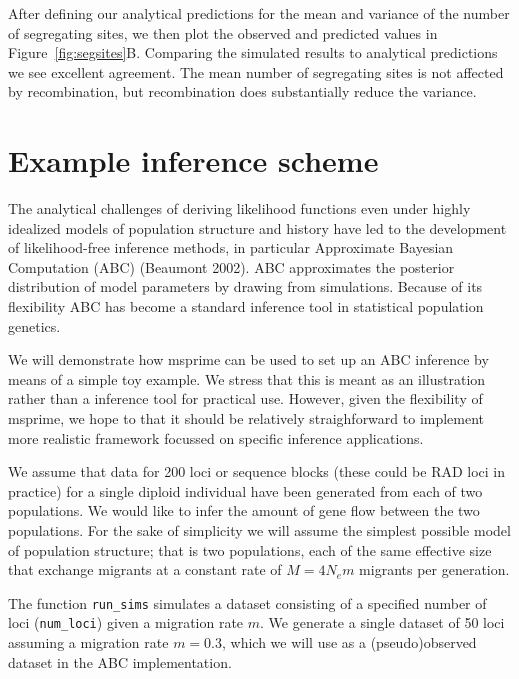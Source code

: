 \documentclass[graybox]{svmult}
\begin{document}
After defining our analytical predictions for the mean and variance of the
number of segregating sites, we then plot the observed and predicted values
in Figure~\ref{fig:segsites}B.
Comparing the simulated results to analytical predictions we see
excellent agreement. The mean number of segregating sites is not
affected by recombination, but recombination does substantially reduce
the variance.

\section{Example inference scheme}\label{sec:inference}

    The analytical challenges of deriving likelihood functions even under
highly idealized models of population structure and history have led to
the development of likelihood-free inference methods, in particular
Approximate Bayesian Computation (ABC) (Beaumont 2002). ABC approximates
the posterior distribution of model parameters by drawing from
simulations. Because of its flexibility ABC has become a standard
inference tool in statistical population genetics.

We will demonstrate how msprime can be used to set up an ABC inference
by means of a simple toy example. We stress that this is meant as an
illustration rather than a inference tool for practical use. However,
given the flexibility of msprime, we hope to that it should be
relatively straighforward to implement more realistic framework focussed
on specific inference applications.

We assume that data for 200 loci or sequence blocks (these could be RAD
loci in practice) for a single diploid individual have been generated
from each of two populations. We would like to infer the amount of gene
flow between the two populations. For the sake of simplicity we will
assume the simplest possible model of population structure; that is two
populations, each of the same effective size that exchange migrants at a
constant rate of \(M=4 N_e m\) migrants per generation.

The function \texttt{run\_sims} simulates a dataset consisting of a
specified number of loci (\texttt{num\_loci}) given a migration rate
\(m\). We generate a single dataset of 50 loci assuming a migration rate
\(m=0.3\), which we will use as a (pseudo)observed dataset in the ABC
implementation.
\end{document}
